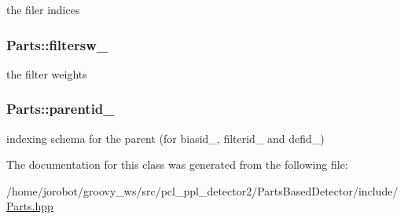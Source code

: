 the filer indices 

\hypertarget{classParts_a1de4d2cb595176d37aae609acbce88d8}{
\subsubsection[{filtersw\-\_\-}]{ {\bf \-Parts\-::filtersw\-\_\-}}}\label{classParts_a1de4d2cb595176d37aae609acbce88d8}


the filter weights 

\hypertarget{classParts_ad74222c286ee6ee93659109a6d1d625f}{
\subsubsection[{parentid\-\_\-}]{ {\bf \-Parts\-::parentid\-\_\-}}}\label{classParts_ad74222c286ee6ee93659109a6d1d625f}


indexing schema for the parent (for biasid\-\_\-, filterid\-\_\- and defid\-\_\-) 



\-The documentation for this class was generated from the following file\-:\begin{DoxyCompactItemize}
\item 
/home/jorobot/groovy\-\_\-ws/src/pcl\-\_\-ppl\-\_\-detector2/\-Parts\-Based\-Detector/include/\hyperlink{Parts_8hpp}{\-Parts.\-hpp}\end{DoxyCompactItemize}
